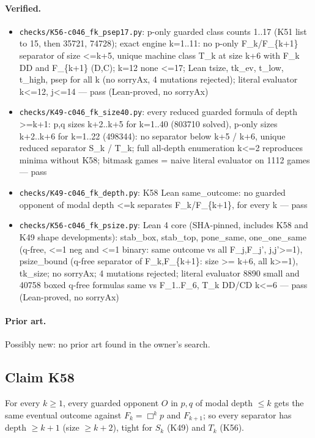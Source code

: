 \documentclass{article}
\begin{document}
\paragraph{Verified.}
\begin{itemize}
\item \texttt{checks/K56-c046\_fk\_psep17.py}: p-only guarded class counts 1..17 (K51 list to 15, then 35721, 74728); exact engine k=1..11: no p-only F\_k/F\_\{k+1\} separator of size \textless{}=k+5, unique machine class T\_k at size k+6 with F\_k DD and F\_\{k+1\} (D,C); k=12 none \textless{}=17; Lean tsize, tk\_ev, t\_low, t\_high, psep for all k (no sorryAx, 4 mutations rejected); literal evaluator k\textless{}=12, j\textless{}=14 --- pass (Lean-proved, no sorryAx)
\item \texttt{checks/K49-c046\_fk\_size40.py}: every reduced guarded formula of depth \textgreater{}=k+1: p,q sizes k+2..k+5 for k=1..40 (803710 solved), p-only sizes k+2..k+6 for k=1..22 (498344): no separator below k+5 / k+6, unique reduced separator S\_k / T\_k; full all-depth enumeration k\textless{}=2 reproduces minima without K58; bitmask games = naive literal evaluator on 1112 games --- pass
\item \texttt{checks/K49-c046\_fk\_depth.py}: K58 Lean same\_outcome: no guarded opponent of modal depth \textless{}=k separates F\_k/F\_\{k+1\}, for every k --- pass
\item \texttt{checks/K56-c046\_fk\_psize.py}: Lean 4 core (SHA-pinned, includes K58 and K49 shape developments): stab\_box, stab\_top, pone\_same, one\_one\_same (q-free, \textless{}=1 neg and \textless{}=1 binary: same outcome vs all F\_j,F\_j', j,j'\textgreater{}=1), psize\_bound (q-free separator of F\_k,F\_\{k+1\}: size \textgreater{}= k+6, all k\textgreater{}=1), tk\_size; no sorryAx; 4 mutations rejected; literal evaluator 8890 small and 40758 boxed q-free formulas same vs F\_1..F\_6, T\_k DD/CD k\textless{}=6 --- pass (Lean-proved, no sorryAx)
\end{itemize}

\paragraph{Prior art.} Possibly new: no prior art found in the owner's search.

\subsection*{Claim K58}

For every $k\ge1$, every guarded opponent $O$ in $p,q$ of modal depth $\le k$ gets the same eventual outcome against $F_k=\Box^kp$ and $F_{k+1}$; so every separator has depth $\ge k+1$ (size $\ge k+2$), tight for $S_k$ (K49) and $T_k$ (K56).
\end{document}
